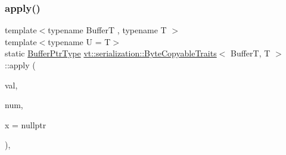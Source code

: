 \mbox{\label{structvt_1_1serialization_1_1_byte_copyable_traits_ad7f6f30f399a7021bb6e3895e955b503}} 
\subsubsection{\texorpdfstring{apply()}{apply()}\hspace{0.1cm}{\footnotesize\ttfamily [2/4]}}
{\footnotesize\ttfamily template$<$typename BufferT , typename T $>$ \\
template$<$typename U  = T$>$ \\
static \hyperlink{structvt_1_1serialization_1_1_byte_copyable_traits_ab06bcaa790f4a227936f6d6854d2bf41}{Buffer\+Ptr\+Type} \hyperlink{structvt_1_1serialization_1_1_byte_copyable_traits}{vt\+::serialization\+::\+Byte\+Copyable\+Traits}$<$ BufferT, T $>$\+::apply (\begin{DoxyParamCaption}\item[{T $\ast$}]{val,  }\item[{Size\+Type}]{num,  }\item[{\hyperlink{structvt_1_1serialization_1_1_byte_copyable_traits_a99c4b667bd99e2cdaad0e0be5b21af50}{is\+Vec\+Type}$<$ U $>$ $\ast$}]{x = {\ttfamily nullptr} }\end{DoxyParamCaption})\hspace{0.3cm}{\ttfamily [inline]}, {\ttfamily [static]}}

\mbox{\label{structvt_1_1serialization_1_1_byte_copyable_traits_a05047eccf3aa8afadaac31783cd74b86}} 
